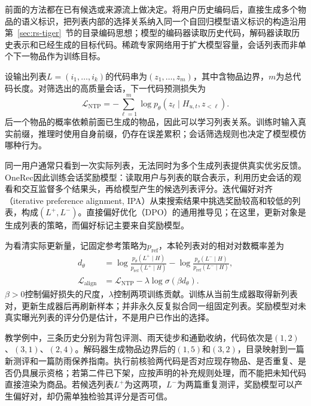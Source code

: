 前面的方法都在已有候选或来源流上做决定。将用户历史编码后，直接生成多个物品的语义标识，把列表内部的选择关系纳入同一个自回归模型语义标识的构造沿用第~\ref{sec:rs-tiger}~节的目录编码思想；模型的编码器读取历史代码，解码器读取历史表示和已经生成的目标代码。稀疏专家网络用于扩大模型容量，会话列表而非单个下一物品作为训练目标。

设输出列表$L=(i_1,\ldots,i_k)$的代码串为$(z_1,\ldots,z_m)$，其中含物品边界，$m$为总代码长度。对筛选出的高质量会话，下一代码预测损失为
\begin{equation}
 \mathcal L_{\mathrm{NTP}}
 =-\sum_{\ell=1}^{m}\log
   p_\theta(z_\ell\mid H_{u,t},z_{<\ell}).
 \label{eq:rs-onerec-ntp}
\end{equation}
后一个物品的概率依赖前面已生成的物品，因此可以学习列表关系。训练时输入真实前缀，推理时使用自身前缀，仍存在误差累积；会话筛选规则也决定了模型模仿哪种行为。

同一用户通常只看到一次实际列表，无法同时为多个生成列表提供真实优劣反馈。OneRec因此训练会话奖励模型：读取用户与列表的联合表示，利用历史会话的观看和交互监督多个结果头，再给模型产生的候选列表评分。迭代偏好对齐（iterative preference alignment, IPA）从束搜索结果中挑选奖励较高和较低的列表，构成$(L^+,L^-)$。直接偏好优化（DPO）的通用推导见；在这里，更新对象是生成列表的策略，而偏好标记主要来自奖励模型。

为看清实际更新量，记固定参考策略为$p_{\mathrm{ref}}$，本轮列表对的相对对数概率差为
\begin{align}
 d_\theta&=
 \log\frac{p_\theta(L^+\mid H)}{p_{\mathrm{ref}}(L^+\mid H)}
 -\log\frac{p_\theta(L^-\mid H)}{p_{\mathrm{ref}}(L^-\mid H)},\\
 \mathcal L_{\mathrm{align}}
 &=\mathcal L_{\mathrm{NTP}}
   -\lambda\log\sigma(\beta d_\theta).
 \label{eq:rs-onerec-dpo}
\end{align}
$\beta>0$控制偏好损失的尺度，$\lambda$控制两项训练贡献。训练从当前生成器取得新列表对，更新生成器后再刷新样本；并非永久反复拟合同一组固定列表。奖励模型对未真实曝光列表的评分仍是估计，不是用户已作出的选择。

教学例中，三条历史分别为背包评测、雨天徒步和通勤收纳，代码依次是$(1,2)$、$(3,1)$、$(2,4)$。解码器生成物品边界后的$(1,5)$和$(3,2)$，目录映射到一篇新测评和一篇防雨保养指南。执行前核验两代码是否对应现存物品、是否重复、是否仍具展示资格；若第二件已下架，应按声明的补充规则处理，而不能把未知代码直接渲染为商品。若候选列表$L^+$为这两项，$L^-$为两篇重复测评，奖励模型可以产生偏好对，却仍需单独检验其评分是否可信。


